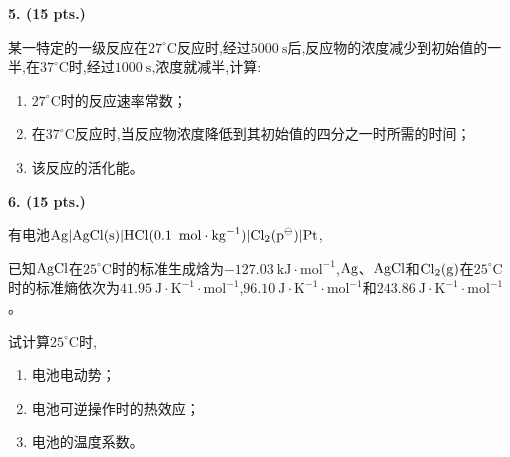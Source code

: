 \vspace{0.5cm}
\noindent\textbf{5. (15 pts.)}

某一特定的一级反应在$27^\circ\mathrm{C}$反应时,经过$5000\ \mathrm{s}$后,反应物的浓度减少到初始值的一半,在$37^\circ\mathrm{C}$时,经过$1000\ \mathrm{s}$,浓度就减半,计算:
\begin{enumerate}[label=(\arabic*), itemsep=1ex]
    \item $27^\circ\mathrm{C}$时的反应速率常数；
    \item 在$37^\circ\mathrm{C}$反应时,当反应物浓度降低到其初始值的四分之一时所需的时间；
    \item 该反应的活化能。
\end{enumerate}

\vspace{0.5cm}
\noindent\textbf{6. (15 pts.)}

有电池$\ce{Ag|AgCl(s)|HCl(0.1\ mol\cdot kg^{-1})|Cl_{2}(p^\ominus)|Pt}$,

已知$\ce{AgCl}$在$25^\circ\mathrm{C}$时的标准生成焓为$-127.03\ \mathrm{kJ\cdot mol^{-1}}$,$\ce{Ag}$、$\ce{AgCl}$和$\ce{Cl_{2}(g)}$在$25^\circ\mathrm{C}$时的标准熵依次为$41.95\ \mathrm{J\cdot K^{-1}\cdot mol^{-1}}$,$96.10\ \mathrm{J\cdot K^{-1}\cdot mol^{-1}}$和$243.86\ \mathrm{J\cdot K^{-1}\cdot mol^{-1}}$。

试计算$25^\circ\mathrm{C}$时,
\begin{enumerate}[label=(\arabic*), itemsep=1ex]
    \item 电池电动势；
    \item 电池可逆操作时的热效应；
    \item 电池的温度系数。
\end{enumerate}